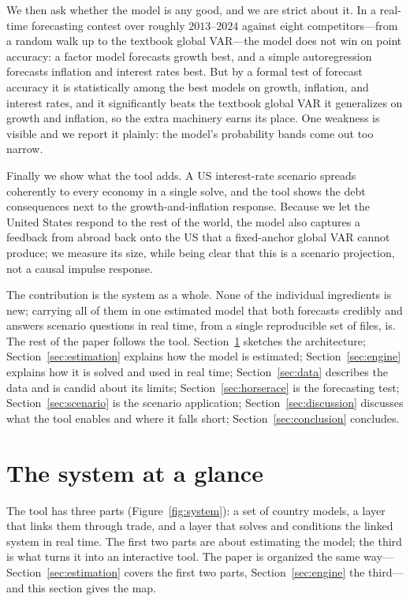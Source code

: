 \documentclass[11pt]{article}
\begin{document}
We then ask whether the model is any good, and we are strict about it. In a real-time forecasting contest
over roughly $2013$--$2024$ against eight competitors---from a random walk up to the textbook global
VAR---the model does not win on point accuracy: a factor model forecasts growth best, and a simple
autoregression forecasts inflation and interest rates best. But by a formal test of forecast accuracy it is
statistically among the best models on growth, inflation, and interest rates, and it significantly beats
the textbook global VAR it generalizes on growth and inflation, so the extra machinery earns its place.
One weakness is visible and we report it plainly: the model's probability bands come out too narrow.

Finally we show what the tool adds. A US interest-rate scenario spreads coherently to every economy in a
single solve, and the tool shows the debt consequences next to the growth-and-inflation response. Because
we let the United States respond to the rest of the world, the model also captures a feedback from abroad
back onto the US that a fixed-anchor global VAR cannot produce; we measure its size, while being clear
that this is a scenario projection, not a causal impulse response.

The contribution is the system as a whole. None of the individual ingredients is new; carrying all of
them in one estimated model that both forecasts credibly and answers scenario questions in real time,
from a single reproducible set of files, is. The rest of the paper follows the tool.
Section~\ref{sec:glance} sketches the architecture; Section~\ref{sec:estimation} explains how the model is
estimated; Section~\ref{sec:engine} explains how it is solved and used in real time;
Section~\ref{sec:data} describes the data and is candid about its limits; Section~\ref{sec:horserace} is
the forecasting test; Section~\ref{sec:scenario} is the scenario application; Section~\ref{sec:discussion}
discusses what the tool enables and where it falls short; Section~\ref{sec:conclusion} concludes.

\section{The system at a glance}
\label{sec:glance}

The tool has three parts (Figure~\ref{fig:system}): a set of country models, a layer that links them
through trade, and a layer that solves and conditions the linked system in real time. The first two parts
are about estimating the model; the third is what turns it into an interactive tool. The paper is
organized the same way---Section~\ref{sec:estimation} covers the first two parts, Section~\ref{sec:engine}
the third---and this section gives the map.
\end{document}

